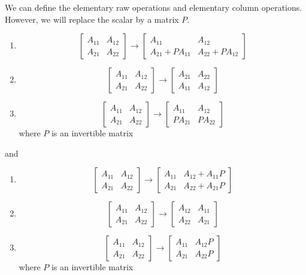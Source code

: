 \documentclass{article}
\begin{document}
\begin{dde}
	We can define the elementary raw operations and elementary column operations. However, we will replace the scalar by a matrix $P$.
	\begin{enumerate}
		\item \[\begin{bmatrix}
			A_{11}&A_{12}\\
			A_{21}&A_{22}
		\end{bmatrix}\rightarrow\begin{bmatrix}
		A_{11}&A_{12}\\
		A_{21}+PA_{11}&A_{22}+PA_{12}
		\end{bmatrix}\]
		\item \[\begin{bmatrix}
			A_{11}&A_{12}\\
			A_{21}&A_{22}
		\end{bmatrix}\rightarrow\begin{bmatrix}
		A_{21}&A_{22}\\
		A_{11}&A_{12}
		\end{bmatrix}\]
		\item \[\begin{bmatrix}
			A_{11}&A_{12}\\
			A_{21}&A_{22}
		\end{bmatrix}\rightarrow\begin{bmatrix}
		A_{11}&A_{12}\\
		PA_{21}&PA_{22}
		\end{bmatrix}\]
		where $P$ is an invertible matrix
	\end{enumerate}
	and
	\begin{enumerate}
		\item \[\begin{bmatrix}
			A_{11}&A_{12}\\
			A_{21}&A_{22}
		\end{bmatrix}\rightarrow\begin{bmatrix}
			A_{11}&A_{12}+A_{11}P\\
			A_{21}&A_{22}+A_{21}P
		\end{bmatrix}\]
		\item \[\begin{bmatrix}
			A_{11}&A_{12}\\
			A_{21}&A_{22}
		\end{bmatrix}\rightarrow\begin{bmatrix}
			A_{12}&A_{11}\\
			A_{22}&A_{21}
		\end{bmatrix}\]
		\item \[\begin{bmatrix}
			A_{11}&A_{12}\\
			A_{21}&A_{22}
		\end{bmatrix}\rightarrow\begin{bmatrix}
			A_{11}&A_{12}P\\
			A_{21}&A_{22}P
		\end{bmatrix}\]
		where $P$ is an invertible matrix
	\end{enumerate}
\end{dde}
\end{document}
